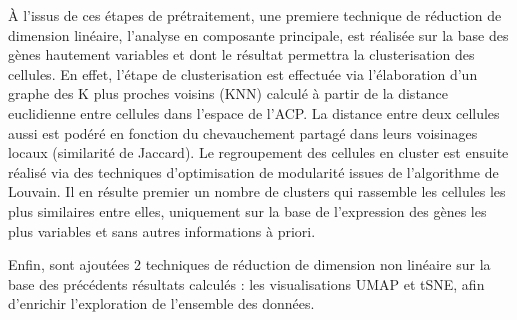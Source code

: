 \documentclass[12pt]{report}
\begin{document}
À l'issus de ces étapes de prétraitement, une premiere technique de réduction de dimension linéaire, l'analyse en composante principale, est réalisée sur la base des gènes hautement variables et dont le résultat permettra la clusterisation des cellules\cite{Macosko}.
En effet, l'étape de clusterisation est effectuée via l'élaboration d'un graphe des K plus proches voisins (KNN) calculé à partir de la distance euclidienne entre cellules dans l'espace de l'ACP.
La distance entre deux cellules aussi est podéré en fonction du chevauchement partagé dans leurs voisinages locaux (similarité de Jaccard). Le regroupement des cellules en cluster est ensuite réalisé via des techniques d'optimisation de modularité issues de l'algorithme de Louvain. 
Il en résulte premier un nombre de clusters qui rassemble les cellules les plus similaires entre elles, uniquement sur la base de l'expression des gènes les plus variables et sans autres informations à priori.

Enfin, sont ajoutées 2 techniques de réduction de dimension non linéaire sur la base des précédents résultats calculés : les visualisations UMAP et tSNE, afin d'enrichir l'exploration de l'ensemble des données. 
\end{document}
